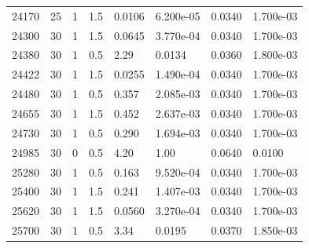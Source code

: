 \documentclass[preview]{standalone}
\begin{document}
{{{\begin{tabular}{L{1.2cm}C{1.2cm} C{0.3cm}C{0.5cm} C{1.4cm}C{1.4cm} C{1.4cm}C{1.4cm}}
  24170  &    25  & 1     & 1.5 &  0.0106  & 6.200e-05  & 0.0340 &  1.700e-03   \\ 
  24300  &    30  & 1     & 1.5 &  0.0645  & 3.770e-04  & 0.0340 &  1.700e-03   \\ 
  24380  &    30  & 1     & 0.5 &  2.29  & 0.0134  & 0.0360 &  1.800e-03   \\ 
  24422  &    30  & 1     & 1.5 &  0.0255  & 1.490e-04  & 0.0340 &  1.700e-03   \\ 
  24480  &    30  & 1     & 0.5 &  0.357  & 2.085e-03  & 0.0340 &  1.700e-03   \\ 
  24655  &    30  & 1     & 1.5 &  0.452  & 2.637e-03  & 0.0340 &  1.700e-03   \\ 
  24730  &    30  & 1     & 0.5 &  0.290  & 1.694e-03  & 0.0340 &  1.700e-03   \\ 
  24985  &    30  & 0     & 0.5 &  4.20  & 1.00  & 0.0640 &  0.0100   \\ 
  25280  &    30  & 1     & 0.5 &  0.163  & 9.520e-04  & 0.0340 &  1.700e-03   \\ 
  25400  &    30  & 1     & 1.5 &  0.241  & 1.407e-03  & 0.0340 &  1.700e-03   \\ 
  25620  &    30  & 1     & 1.5 &  0.0560  & 3.270e-04  & 0.0340 &  1.700e-03   \\ 
  25700  &    30  & 1     & 0.5 &  3.34  & 0.0195  & 0.0370 &  1.850e-03   \\ 
\hline 
\end{tabular} 

}}}
\end{document}

